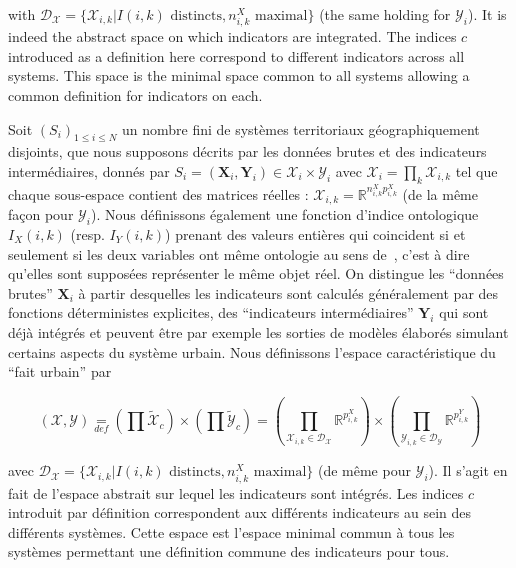 {with $\mathcal{D}_{\mathcal{X}}=\{\mathcal{X}_{i,k}|I(i,k)\textrm{ distincts},n_{i,k}^{X}\mbox{ maximal}\}$
(the same holding for $\mathcal{Y}_{i}$). It is indeed the abstract space on which indicators are integrated. The indices $c$ introduced as a definition here correspond to different indicators across all systems. This space is the minimal space common to all systems allowing a common definition for indicators on each.
}{
Soit $(S_{i})_{1\leq i\leq N}$ un nombre fini de systèmes territoriaux géographiquement disjoints, 
que nous supposons décrits par les données brutes et des indicateurs intermédiaires, donnés par $S_{i}=(\mathbf{X}_{i},\mathbf{Y}_{i})\in\mathcal{X}_{i}\times\mathcal{Y}_{i}$ avec $\mathcal{X}_{i}=\prod_{k}\mathcal{X}_{i,k}$ tel que chaque sous-espace contient des matrices réelles : $\mathcal{X}_{i,k}=\mathbb{R}^{n_{i,k}^{X}p_{i,k}^{X}}$ (de la même façon pour $\mathcal{Y}_{i}$). Nous définissons également une fonction d'indice ontologique $I_{X}(i,k)$ (resp. $I_{Y}(i,k)$) prenant des valeurs entières qui coincident si et seulement si les deux variables ont même ontologie au sens de~\cite{livet2010}, c'est à dire qu'elles sont supposées représenter le même objet réel. On distingue les ``données brutes'' $\mathbf{X}_{i}$ à partir desquelles les indicateurs sont calculés généralement par des fonctions déterministes explicites, 
 des ``indicateurs intermédiaires'' $\mathbf{Y}_{i}$ qui sont déjà intégrés et peuvent être par exemple les sorties de modèles élaborés simulant certains aspects du système urbain. Nous définissons l'espace caractéristique du ``fait urbain'' par


\begin{equation}
(\mathcal{X},\mathcal{Y}) \underset{def}{=} \left(\prod\tilde{\mathcal{X}}_{c}\right)\times\left(\prod\tilde{\mathcal{Y}}_{c}\right) = \left(\prod_{\mathcal{X}_{i,k}\in\mathcal{D}_{\mathcal{X}}}\mathbb{R}^{p_{i,k}^{X}}\right)\times\left(\prod_{\mathcal{Y}_{i,k}\in\mathcal{D}_{\mathcal{Y}}}\mathbb{R}^{p_{i,k}^{Y}}\right)
\end{equation}

avec $\mathcal{D}_{\mathcal{X}}=\{\mathcal{X}_{i,k}|I(i,k)\textrm{ distincts},n_{i,k}^{X}\mbox{ maximal}\}$
(de même pour $\mathcal{Y}_{i}$). Il s'agit en fait de l'espace abstrait sur lequel les indicateurs sont intégrés. Les indices $c$ introduit par définition correspondent aux différents indicateurs au sein des différents systèmes. Cette espace est l'espace minimal commun à tous les systèmes permettant une définition commune des indicateurs pour tous.
}



